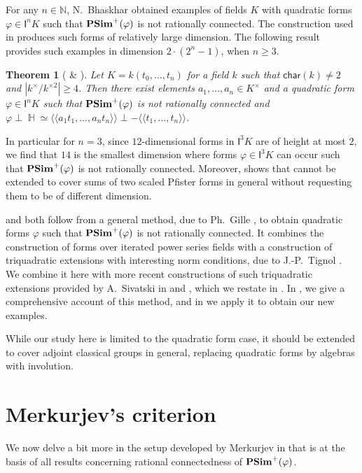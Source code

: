 \documentclass[twoside,11pt]{amsart}
\newtheorem{thmI}{Theorem}
\numberwithin{equation}{section}
\theoremstyle{definition}
\newcommand\hh{\operatorname{\mathbb{H}}}
\newcommand{\car}{\mathsf{char}}
\newcommand{\vf}{\varphi}
\newcommand{\mg}[1]{{#1}^{\times}}
\newcommand{\sq}[1]{{#1}^{\times 2}}
\newcommand{\scg}[1]{\mg{#1}/\sq{#1}}
\newcommand{\nat}{\mathbb{N}}
\newcommand{\la}{\langle}
\newcommand{\ra}{\rangle}
\newcommand{\lla}{\la\!\la}
\newcommand{\rra}{\ra\!\ra}
\renewcommand{\geq}{\geqslant}
\newcommand{\I}{\mathsf{I}}
\renewcommand{\geq}{\geqslant}
\begin{document}
For any $n\in\nat$, N.~Bhaskhar \cite{Bha14} obtained examples of fields $K$ with quadratic forms $\vf\in \I^nK$ such that ${\bf PSim}^+(\vf)$ is not rationally connected. 
The construction used in \cite{Bha14} produces such forms of relatively large dimension.
The following result provides such examples in dimension $2\cdot(2^n-1)$, when $n\geq 3$.

\begin{thmI}[ \& ]\label{T4}
    Let $K=k(t_0,\ldots,t_n)$ for a field $k$ such that $\car(k)\neq 2$ and $|\scg{k}|\geq 4$.
    Then there exist elements $a_1,\ldots,a_n\in\mg{K}$ and a quadratic form $\vf\in\I^nK$ such that  ${\bf PSim}^+(\vf)$ is not rationally connected  and $\vf\perp\hh \simeq \lla a_1t_1,\ldots,a_nt_n\rra\perp -\lla t_1,\ldots,t_n\rra$.
\end{thmI}

In particular for $n=3$, since $12$-dimensional forms in $\I^3K$ are of height at most $2$, we find that $14$ is the smallest dimension where forms $\vf\in\I^3K$
can occur such that ${\bf PSim}^+(\vf)$ is not rationally connected.
Moreover,  shows that  cannot be extended to cover sums of two scaled Pfister forms in general without requesting them to be of different dimension.

 and  both follow from a general method, due to Ph.~Gille \cite{Gil97}, to obtain 
 quadratic forms $\varphi$ such that ${\bf PSim}^+(\varphi)$ is not rationally connected.
 It combines the construction of forms over iterated power series fields with a construction of triquadratic extensions with interesting norm conditions, due to J.-P.~Tignol \cite{Tig81}.
We combine it here with more recent constructions of such triquadratic extensions provided by A.~Sivatski in \cite{Siv10} and \cite{Siv18}, which we restate in .
In , we give a comprehensive account of this method, and in  we apply it to obtain our new examples.


While our study here is limited to the quadratic form case, it should be extended to cover adjoint classical groups in general,  replacing quadratic forms by algebras with involution.

\section{Merkurjev's criterion}
\label{S:Merk}

We now delve a bit more in the setup developed by Merkurjev in \cite{Mer96} that is at the basis of all results concerning rational connectedness of ${\bf PSim}^+(\vf)$.
\end{document}
